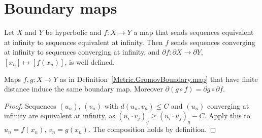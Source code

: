 \section*{Boundary maps}

\begin{definition}
  \label{Metric.GromovBoundary.map}
  Let $X$ and $Y$ be hyperbolic and $f \colon X \to Y$ a map that sends sequences equivalent at
  infinity to sequences equivalent at infinity. Then $f$ sends sequences converging at infinity to
  sequences converging at infinity, and $\partial f \colon \partial X \to \partial Y$, $[x_n]
  \mapsto
  [f(x_n)]$, is well defined.
\end{definition}

\begin{lemma}
  \label{Metric.GromovBoundary.map_eq_of_hasFiniteDist}
  Maps $f, g \colon X \to Y$ as in Definition~\ref{Metric.GromovBoundary.map} that have finite
  distance induce the same boundary map. Moreover
  $\partial(g \circ f) = \partial g \circ \partial f$.
\end{lemma}
\begin{proof}
  Sequences $(u_n)$, $(v_n)$ with $d(u_n, v_n) \le C$ and $(u_n)$ converging at infinity are
  equivalent at infinity, as $(u_i \cdot v_j)_q \ge (u_i \cdot u_j)_q - C$. Apply this to $u_n =
  f(x_n)$, $v_n = g(x_n)$. The composition holds by definition.
\end{proof}


